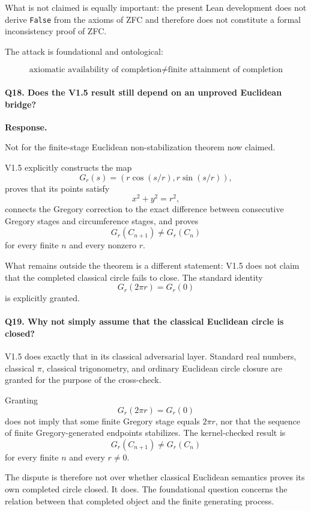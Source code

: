 \documentclass[11pt,a4paper]{article}
\begin{document}
What is not claimed is equally important: the present Lean development
does not derive \texttt{False} from the axioms of ZFC and therefore does
not constitute a formal inconsistency proof of ZFC.

The attack is foundational and ontological:

\[
\boxed{
\text{axiomatic availability of completion}
\neq
\text{finite attainment of completion}
}
\]

\paragraph{Q18. Does the V1.5 result still depend on an unproved Euclidean bridge?}

\textbf{Response.}

Not for the finite-stage Euclidean non-stabilization theorem now
claimed.

V1.5 explicitly constructs the map
\[
G_r(s)
=
\left(
r\cos(s/r),
r\sin(s/r)
\right),
\]
proves that its points satisfy
\[
x^2+y^2=r^2,
\]
connects the Gregory correction to the exact difference between
consecutive Gregory stages and circumference stages, and proves
\[
G_r(C_{n+1})
\neq
G_r(C_n)
\]
for every finite \(n\) and every nonzero \(r\).

What remains outside the theorem is a different statement: V1.5 does
not claim that the completed classical circle fails to close.  The
standard identity
\[
G_r(2\pi r)=G_r(0)
\]
is explicitly granted.

\paragraph{Q19. Why not simply assume that the classical Euclidean circle is closed?}

V1.5 does exactly that in its classical adversarial layer.  Standard
real numbers, classical $\pi$, classical trigonometry, and ordinary
Euclidean circle closure are granted for the purpose of the
cross-check.

Granting
\[
G_r(2\pi r)=G_r(0)
\]
does not imply that some finite Gregory stage equals $2\pi r$, nor
that the sequence of finite Gregory-generated endpoints stabilizes.
The kernel-checked result is
\[
G_r(C_{n+1})\neq G_r(C_n)
\]
for every finite $n$ and every $r\neq0$.

The dispute is therefore not over whether classical Euclidean
semantics proves its own completed circle closed.  It does.  The
foundational question concerns the relation between that completed
object and the finite generating process.
\end{document}
